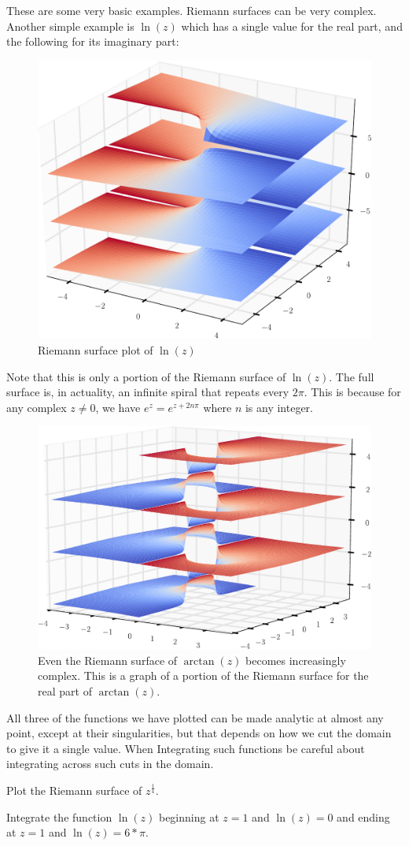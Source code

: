 These are some very basic examples. Riemann surfaces can be very complex. Another simple example is $\ln(z)$ which has a single value for the real part, and the following for its imaginary part:
\begin{figure}[h]
\includegraphics[width=\textwidth]{RiemannSurface3}
\caption{Riemann surface plot of $\ln(z)$}
\end{figure}
Note that this is only a portion of the Riemann surface of $\ln(z)$. The full surface is, in actuality, an infinite spiral that repeats every $2\pi$. This is because for any complex $z\neq 0$, we have $e^z=e^{z+2n\pi}$ where $n$ is any integer.
\begin{figure}[h]
\includegraphics[width=.8\textwidth]{RiemannSurface4.pdf}
\caption{Even the Riemann surface of $\arctan(z)$ becomes increasingly complex. This is a graph of a portion of the Riemann surface for the real part of $\arctan(z)$.}
\end{figure}
All three of the functions we have plotted can be made analytic at almost any point, except at their singularities, but that depends on how we cut the domain to give it a single value. When Integrating such functions be careful about integrating across such cuts in the domain.

\begin{problem}
Plot the Riemann surface of $z^{\frac{1}{4}}$.
\end{problem}

\begin{problem}
Integrate the function $\ln(z)$ beginning at $z=1$ and $\ln(z)=0$ and ending at $z=1$ and $\ln(z)=6*\pi$.
\end{problem}